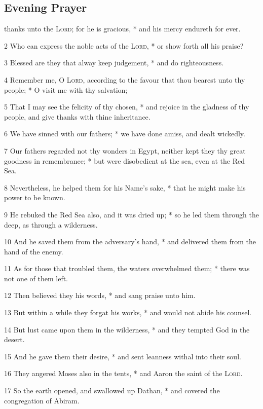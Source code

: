 \subsection{Evening Prayer}
 thanks unto the {\textsc{Lord}}; for he is gracious, * and his mercy endureth for ever.\par
2 Who can express the noble acts of the {\textsc{Lord}}, * or show forth all his praise?\par
3 Blessed are they that alway keep judgement, * and do righteousness.\par
4 Remember me, O {\textsc{Lord}}, according to the favour that thou bearest unto thy people; * O visit me with thy salvation;\par
5 That I may see the felicity of thy chosen, * and rejoice in the gladness of thy people, and give thanks with thine inheritance.\par
6 We have sinned with our fathers; * we have done amiss, and dealt wickedly.\par
7 Our fathers regarded not thy wonders in Egypt, neither kept they thy great goodness in remembrance; * but were disobedient at the sea, even at the Red Sea.\par
8 Nevertheless, he helped them for his Name's sake, * that he might make his power to be known.\par
9 He rebuked the Red Sea also, and it was dried up; * so he led them through the deep, as through a wilderness.\par
10 And he saved them from the adversary's hand, * and delivered them from the hand of the enemy.\par
11 As for those that troubled them, the waters overwhelmed them; * there was not one of them left.\par
12 Then believed they his words, * and sang praise unto him.\par
13 But within a while they forgat his works, * and would not abide his counsel.\par
14 But lust came upon them in the wilderness, * and they tempted God in the desert.\par
15 And he gave them their desire, * and sent leanness withal into their soul.\par
16 They angered Moses also in the tents, * and Aaron the saint of the {\textsc{Lord}}.\par
17 So the earth opened, and swallowed up Dathan, * and covered the congregation of Abiram.\par
